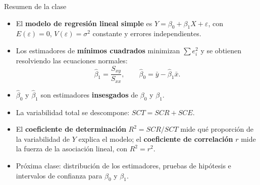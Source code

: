 \documentclass[aspectratio=169,11pt]{beamer}
\begin{document}
\begin{frame}{Resumen de la clase}
\begin{itemize}
\item El \textbf{modelo de regresión lineal simple} es $Y=\beta_0+\beta_1 X+\varepsilon$, con $E(\varepsilon)=0$, $V(\varepsilon)=\sigma^2$ constante y errores independientes.
\item Los estimadores de \textbf{mínimos cuadrados} minimizan $\sum e_i^2$ y se obtienen resolviendo las ecuaciones normales:
\[
\hat\beta_1 = \frac{S_{xy}}{S_{xx}}, \qquad \hat\beta_0 = \bar y - \hat\beta_1\bar x.
\]
\item $\hat\beta_0$ y $\hat\beta_1$ son estimadores \textbf{insesgados} de $\beta_0$ y $\beta_1$.
\item La variabilidad total se descompone: $SCT = SCR + SCE$.
\item El \textbf{coeficiente de determinación} $R^2=SCR/SCT$ mide qué proporción de la variabilidad de $Y$ explica el modelo; el \textbf{coeficiente de correlación} $r$ mide la fuerza de la asociación lineal, con $R^2=r^2$.
\item Próxima clase: distribución de los estimadores, pruebas de hipótesis e intervalos de confianza para $\beta_0$ y $\beta_1$.
\end{itemize}
\end{frame}
\end{document}
